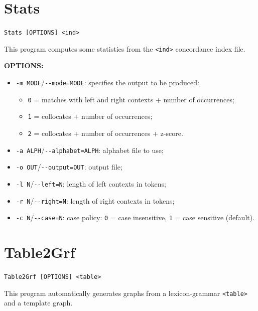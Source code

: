 \section{Stats}

\verb+Stats [OPTIONS] <ind>+

\bigskip
\noindent This program computes some statistics from the \verb+<ind>+
concordance index file.

\bigskip
\noindent \textbf{OPTIONS:}
\begin{itemize}
  \item \verb+-m MODE+/\verb+--mode=MODE+: specifies the output to be produced:
  \begin{itemize}
      \item \verb+0+ = matches with left and right contexts + number of
      occurrences;
      \item \verb+1+ = collocates + number of occurrences;
      \item \verb+2+ = collocates + number of occurrences + z-score.
  \end{itemize}

  \item \verb+-a ALPH+/\verb+--alphabet=ALPH+: alphabet file to use;

  \item \verb+-o OUT+/\verb+--output=OUT+: output file;

  \item \verb+-l N+/\verb+--left=N+: length of left contexts in tokens;
   
  \item \verb+-r N+/\verb+--right=N+: length of right contexts in tokens;
  
  \item \verb+-c N+/\verb+--case=N+: case policy: \verb+0+ = case insensitive,
  \verb+1+ = case sensitive (default).
\end{itemize}







\section{Table2Grf}
\verb+Table2Grf [OPTIONS] <table>+

\bigskip
\noindent {}This 
program automatically generates graphs from a lexicon-grammar \verb+<table>+
and a template graph.


